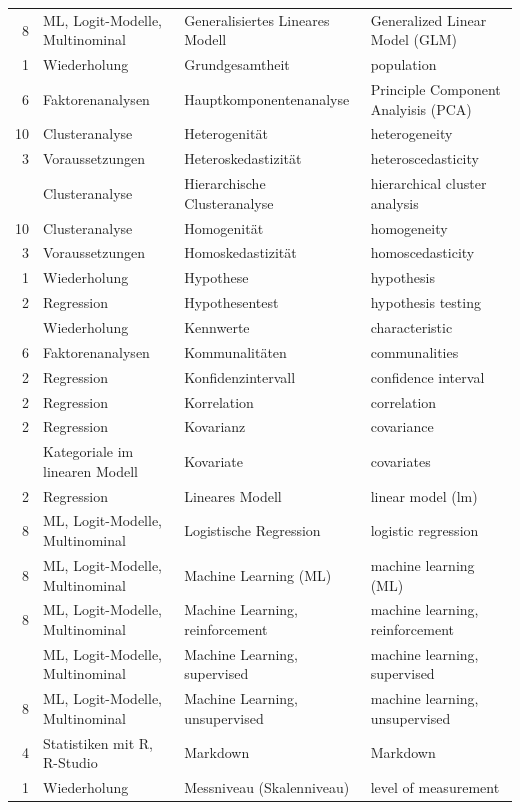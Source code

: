 \documentclass[
  10pt,
  letterpaper,
  a4paper, twoside]{scrreprt}
\begin{document}
\begin{longtable*}{rlll}
8 & ML, Logit-Modelle, Multinominal & Generalisiertes Lineares Modell & Generalized Linear Model (GLM)\\
1 & Wiederholung & Grundgesamtheit & population\\
6 & Faktorenanalysen & Hauptkomponentenanalyse & Principle Component Analyisis (PCA)\\
10 & Clusteranalyse & Heterogenität & heterogeneity\\
3 & Voraussetzungen & Heteroskedastizität & heteroscedasticity\\
 & Clusteranalyse & Hierarchische Clusteranalyse & hierarchical cluster analysis\\
10 & Clusteranalyse & Homogenität & homogeneity\\
3 & Voraussetzungen & Homoskedastizität & homoscedasticity\\
1 & Wiederholung & Hypothese & hypothesis\\
2 & Regression & Hypothesentest & hypothesis testing\\
 & Wiederholung & Kennwerte & characteristic\\
6 & Faktorenanalysen & Kommunalitäten & communalities\\
2 & Regression & Konfidenzintervall & confidence interval\\
2 & Regression & Korrelation & correlation\\
2 & Regression & Kovarianz & covariance\\
 & Kategoriale im linearen Modell & Kovariate & covariates\\
2 & Regression & Lineares Modell & linear model (lm)\\
8 & ML, Logit-Modelle, Multinominal & Logistische Regression & logistic regression\\
8 & ML, Logit-Modelle, Multinominal & Machine Learning (ML) & machine learning (ML)\\
8 & ML, Logit-Modelle, Multinominal & Machine Learning, reinforcement & machine learning, reinforcement\\
 & ML, Logit-Modelle, Multinominal & Machine Learning, supervised & machine learning, supervised\\
8 & ML, Logit-Modelle, Multinominal & Machine Learning, unsupervised & machine learning, unsupervised\\
4 & Statistiken mit R, R-Studio & Markdown & Markdown\\
1 & Wiederholung & Messniveau (Skalenniveau) & level of measurement\\

\end{longtable*}
\end{document}
